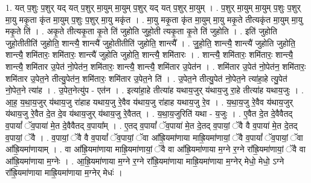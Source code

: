 \documentclass[17pt]{extarticle}
\begin{document}
1. यत् प॒शुः प॒शुर् यद् यत् प॒शुर् मा॒युम् मा॒युम् प॒शुर् यद् यत् प॒शुर् मा॒युम् । . प॒शुर् मा॒युम् मा॒युम् प॒शुः प॒शुर् मा॒यु मकृ॒ता कृ॑त मा॒युम् प॒शुः प॒शुर् मा॒यु मकृ॑त । . मा॒यु मकृ॒ता कृ॑त मा॒युम् मा॒यु मकृ॒ते तीत्यकृ॑त मा॒युम् मा॒यु मकृ॒ते ति॑ । . अकृ॒ते तीत्यकृ॒ता कृ॒ते ति॑ जुहोति जुहो॒ती त्यकृ॒ता कृ॒ते ति॑ जुहोति । . इति॑ जुहोति जुहो॒तीतीति॑ जुहोति॒ शान्त्यै॒ शान्त्यै॑ जुहो॒तीतीति॑ जुहोति॒ शान्त्यै᳚ । . जु॒हो॒ति॒ शान्त्यै॒ शान्त्यै॑ जुहोति जुहोति॒ शान्त्यै॒ शमि॑तारः॒ शमि॑तारः॒ शान्त्यै॑ जुहोति जुहोति॒ शान्त्यै॒ शमि॑तारः । . शान्त्यै॒ शमि॑तारः॒ शमि॑तारः॒ शान्त्यै॒ शान्त्यै॒ शमि॑तार उ॒पेत॑ नो॒पेत॑न॒ शमि॑तारः॒ शान्त्यै॒ शान्त्यै॒ शमि॑तार उ॒पेत॑न । . शमि॑तार उ॒पेत॑ नो॒पेत॑न॒ शमि॑तारः॒ शमि॑तार उ॒पेत॒ने तीत्यु॒पेत॑न॒ शमि॑तारः॒ शमि॑तार उ॒पेत॒ने ति॑ । . उ॒पेत॒ने तीत्यु॒पेत॑ नो॒पेत॒ने त्या॑हा॒हे त्यु॒पेत॑ नो॒पेत॒ने त्या॑ह । . उ॒पेत॒नेत्यु॑प - एत॑न । . इत्या॑हा॒हे तीत्या॑ह यथाय॒जुर् य॑थाय॒जु रा॒हे तीत्या॑ह यथाय॒जुः । . आ॒ह॒ य॒था॒य॒जुर् य॑थाय॒जु रा॑हाह यथाय॒जु रे॒वैव य॑थाय॒जु रा॑हाह यथाय॒जु रे॒व । . य॒था॒य॒जु रे॒वैव य॑थाय॒जुर् य॑थाय॒जु रे॒वैत दे॒त दे॒व य॑थाय॒जुर् य॑थाय॒जु रे॒वैतत् । . य॒था॒य॒जुरिति॑ यथा - य॒जुः । . ए॒वैत दे॒त दे॒वैवैतद् व॒पायां᳚ ॅव॒पाया॑ मे॒त दे॒वैवैतद् व॒पाया᳚म् । . ए॒तद् व॒पायां᳚ ॅव॒पाया॑ मे॒त दे॒तद् व॒पायां॒ ॅवै वै व॒पाया॑ मे॒त दे॒तद् व॒पायां॒ ॅवै । . व॒पायां॒ ॅवै वै व॒पायां᳚ ॅव॒पायां॒ ॅवा आ᳚ह्रि॒यमा॑णाया माह्रि॒यमा॑णायां॒ ॅवै व॒पायां᳚ ॅव॒पायां॒ ॅवा आ᳚ह्रि॒यमा॑णायाम् । . वा आ᳚ह्रि॒यमा॑णाया माह्रि॒यमा॑णायां॒ ॅवै वा आ᳚ह्रि॒यमा॑णाया म॒ग्ने र॒ग्ने रा᳚ह्रि॒यमा॑णायां॒ ॅवै वा आ᳚ह्रि॒यमा॑णाया म॒ग्नेः । . आ॒ह्रि॒यमा॑णाया म॒ग्ने र॒ग्ने रा᳚ह्रि॒यमा॑णाया माह्रि॒यमा॑णाया म॒ग्नेर् मेधो॒ मेधो॒ ऽग्ने रा᳚ह्रि॒यमा॑णाया माह्रि॒यमा॑णाया म॒ग्नेर् मेधः॑ । \newline
\end{document}
